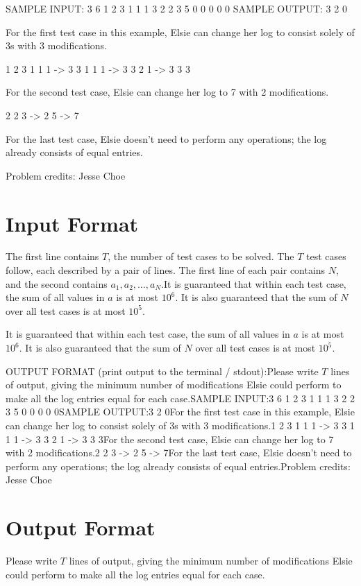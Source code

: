 \documentclass[12pt]{article}
\begin{document}
SAMPLE INPUT:
3
6
1 2 3 1 1 1
3
2 2 3
5
0 0 0 0 0
SAMPLE OUTPUT: 
3
2
0

For the first test case in this example, Elsie can change her log to consist
solely of 3s with 3 modifications.


   1 2 3 1 1 1
-> 3 3 1 1 1
-> 3 3 2 1
-> 3 3 3

For the second test case, Elsie can change her log to 7 with 2 modifications.


   2 2 3
-> 2 5
-> 7

For the last test case, Elsie doesn’t need to perform any operations; the log
already consists of equal entries.


Problem credits: Jesse Choe



\section*{Input Format}
The first line contains $T$, the number of test cases to be solved. The $T$ test
cases follow, each described by a pair of lines. The first line of each pair
contains $N$, and the second contains $a_1,a_2,\ldots,a_N$.It is guaranteed that within each test case, the sum of all values in $a$ is at
most $10^6$. It is also guaranteed that the sum of $N$ over all test cases is at
most
$10^5$.

It is guaranteed that within each test case, the sum of all values in $a$ is at
most $10^6$. It is also guaranteed that the sum of $N$ over all test cases is at
most
$10^5$.

OUTPUT FORMAT (print output to the terminal / stdout):Please write $T$ lines of output, giving the minimum number of modifications
Elsie could perform to make all the log entries equal for each case.SAMPLE INPUT:3
6
1 2 3 1 1 1
3
2 2 3
5
0 0 0 0 0SAMPLE OUTPUT:3
2
0For the first test case in this example, Elsie can change her log to consist
solely of 3s with 3 modifications.1 2 3 1 1 1
-> 3 3 1 1 1
-> 3 3 2 1
-> 3 3 3For the second test case, Elsie can change her log to 7 with 2 modifications.2 2 3
-> 2 5
-> 7For the last test case, Elsie doesn’t need to perform any operations; the log
already consists of equal entries.Problem credits: Jesse Choe

\section*{Output Format}
Please write $T$ lines of output, giving the minimum number of modifications
Elsie could perform to make all the log entries equal for each case.
\end{document}
